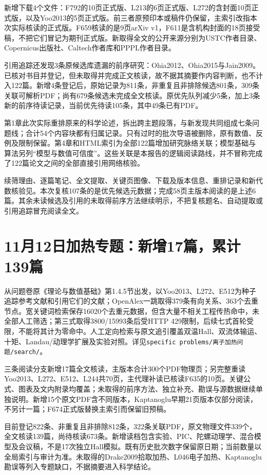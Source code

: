 \documentclass[UTF8,a4paper,11pt,openany,fontset=fandol]{ctexbook}
\begin{document}
新增下载4个文件：F792的10页正式版、L213的6页正式版、L272的含封面10页正式版，以及Yoo2013的5页正式版。前三者原预印本或稿件仍保留，主索引改指本次实际核读的正式版。F659核读的是9页arXiv v1，F611是含机构封面的18页接受稿，不把它们冒记为期刊正式版。新取得全文的公开来源分别为USTC作者目录、Copernicus出版社、Caltech作者库和PPPL作者目录。

引用追踪还发现3条原候选库遗漏的前序研究：Ohia2012、Ohia2015与Jain2009。已核对书目并登记，但未取得并完成正文核读，故不据其摘要作内容判断，也不计入122篇。新增4条登记后，原始记录为811条，非重复且非排除候选801条，309条关联可解析PDF；尚有679条候选未完成全文核读。原优先队列减少5条，加上3条新的前序待读记录，当前优先待读105条，其中49条已有PDF。

第1章此次实际重排原来的科学论述，拆出跨主题段落，与新发现共同组成七条问题线；合计54个内容块都有归属记录。只有过时的批次导语被删除，原有数值、反例及限制保留。第4章和HTML索引为全部122篇增加研究脉络关联；模型基础与算法另列“模型与数值可信度”。这些关联是本报告的逻辑阅读路线，并不冒称完成了122篇论文之间的全部直接引用网络核验。

续筛理由、逐篇笔记、全文提取、关键页图像、下载及版本信息、重排记录和新代数核验见。本次复核107条的是优先候选元数据；完成58页主版本阅读的是上述6篇。其余未读候选及引用的未取得前序方法继续明示，不把复核题名、自动提取或引用追踪冒充阅读全文。

\section{11月12日加热专题：新增17篇，累计139篇}
从问题卷原《理论与数值基础》第1.4.5节出发，以Yoo2013、L272、E512为种子追踪参考文献和引用它们的文献；OpenAlex一跳取得379条有向关系、363个去重节点。宽关键词检索保存16020个去重元数据，但含大量不相关工程传热命中，未全部人工筛选；第三式取得3800/15993条后受HTTP 429限制，后续七式首轮受限，不能将其计为零命中。人工定向检索与原文追引覆盖双温Hall、双流体输运、十矩、Landau/动理学扩展及实验对照。详见\texttt{specific problems/离子加热问题/search/}。

三条阅读分支新增17篇全文核读，主版本合计300个PDF物理页；另完整重读Yoo2013、L272、E512、L244共70页，主代理补读已核读F635的10页。关键公式、图表及文内附录均覆盖；未取得的前序方法、独立补充、勘误与源数据继续单独说明。新增15个原文PDF含不同版本，Kaptanoglu早期21页版本仅部分阅读，不另计一篇；F674正式版替换主索引而保留旧预稿。

目前登记822条、非重复且非排除812条，322条关联PDF，原文物理文件339个，全文核读139篇，尚待核读673条。新增读档包含实验、PIC、陀螺动理学、混合模型及会议稿，不是17次独立Hall模拟。既有历史批次数字保留原日期；当前数量以全局索引与审计为准。未取得的Drake2009拾取加热、L046电子加热、Kaptanoglu勘误等列入专题缺口，不据摘要进入科学结论。
\end{document}
